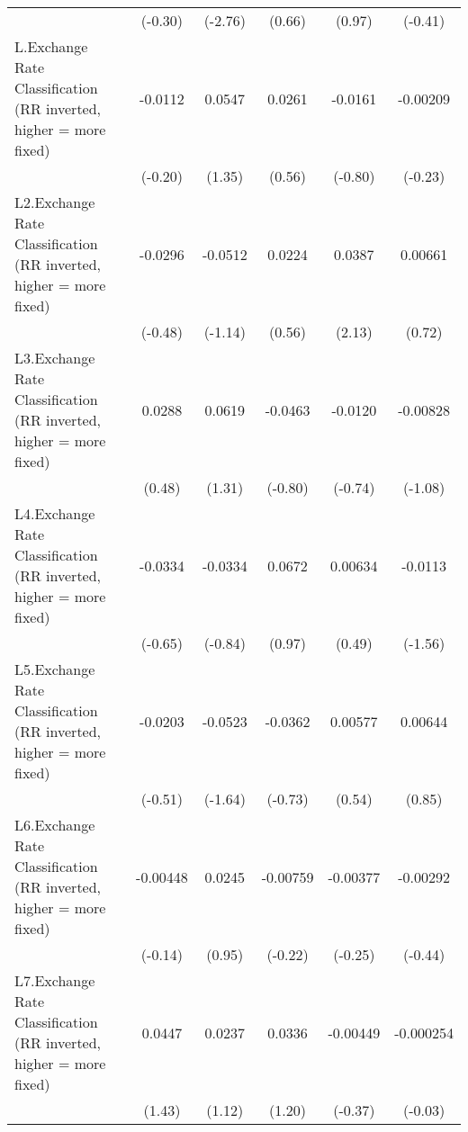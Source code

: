 {\begin{tabular}{l*{5}{c}}
                &  (-0.30)         &  (-2.76)         &   (0.66)         &   (0.97)         &  (-0.41)         \\
[1em]
L.Exchange Rate Classification (RR inverted, higher = more fixed)&  -0.0112         &   0.0547         &   0.0261         &  -0.0161         & -0.00209         \\
                &  (-0.20)         &   (1.35)         &   (0.56)         &  (-0.80)         &  (-0.23)         \\
[1em]
L2.Exchange Rate Classification (RR inverted, higher = more fixed)&  -0.0296         &  -0.0512         &   0.0224         &   0.0387\sym{*}  &  0.00661         \\
                &  (-0.48)         &  (-1.14)         &   (0.56)         &   (2.13)         &   (0.72)         \\
[1em]
L3.Exchange Rate Classification (RR inverted, higher = more fixed)&   0.0288         &   0.0619         &  -0.0463         &  -0.0120         & -0.00828         \\
                &   (0.48)         &   (1.31)         &  (-0.80)         &  (-0.74)         &  (-1.08)         \\
[1em]
L4.Exchange Rate Classification (RR inverted, higher = more fixed)&  -0.0334         &  -0.0334         &   0.0672         &  0.00634         &  -0.0113         \\
                &  (-0.65)         &  (-0.84)         &   (0.97)         &   (0.49)         &  (-1.56)         \\
[1em]
L5.Exchange Rate Classification (RR inverted, higher = more fixed)&  -0.0203         &  -0.0523         &  -0.0362         &  0.00577         &  0.00644         \\
                &  (-0.51)         &  (-1.64)         &  (-0.73)         &   (0.54)         &   (0.85)         \\
[1em]
L6.Exchange Rate Classification (RR inverted, higher = more fixed)& -0.00448         &   0.0245         & -0.00759         & -0.00377         & -0.00292         \\
                &  (-0.14)         &   (0.95)         &  (-0.22)         &  (-0.25)         &  (-0.44)         \\
[1em]
L7.Exchange Rate Classification (RR inverted, higher = more fixed)&   0.0447         &   0.0237         &   0.0336         & -0.00449         &-0.000254         \\
                &   (1.43)         &   (1.12)         &   (1.20)         &  (-0.37)         &  (-0.03)         \\

\end{tabular}}
